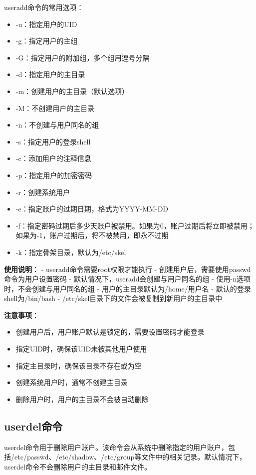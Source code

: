 \documentclass[12pt,UTF8]{ctexbook}
\begin{document}
useradd命令的常用选项：
\begin{itemize}
    \item -u：指定用户的UID
    \item -g：指定用户的主组
    \item -G：指定用户的附加组，多个组用逗号分隔
    \item -d：指定用户的主目录
    \item -m：创建用户的主目录（默认选项）
    \item -M：不创建用户的主目录
    \item -n：不创建与用户同名的组
    \item -s：指定用户的登录shell
    \item -c：添加用户的注释信息
    \item -p：指定用户的加密密码
    \item -r：创建系统用户
    \item -e：指定账户的过期日期，格式为YYYY-MM-DD
    \item -f：指定密码过期后多少天账户被禁用。如果为0，账户过期后将立即被禁用；如果为-1，账户过期后，将不被禁用，即永不过期
    \item -k：指定骨架目录，默认为/etc/skel
\end{itemize}

\textbf{使用说明}：
- useradd命令需要root权限才能执行
- 创建用户后，需要使用passwd命令为用户设置密码
- 默认情况下，useradd会创建与用户同名的组
- 使用-n选项时，不会创建与用户同名的组
- 用户的主目录默认为/home/用户名
- 默认的登录shell为/bin/bash
- /etc/skel目录下的文件会被复制到新用户的主目录中

\textbf{注意事项}：
\begin{itemize}
    \item 创建用户后，用户账户默认是锁定的，需要设置密码才能登录
    \item 指定UID时，确保该UID未被其他用户使用
    \item 指定主目录时，确保该目录不存在或为空
    \item 创建系统用户时，通常不创建主目录
    \item 删除用户时，用户的主目录不会被自动删除
\end{itemize}

\subsection{userdel命令}
userdel命令用于删除用户账户。该命令会从系统中删除指定的用户账户，包括/etc/passwd、/etc/shadow、/etc/group等文件中的相关记录。默认情况下，userdel命令不会删除用户的主目录和邮件文件。
\end{document}
